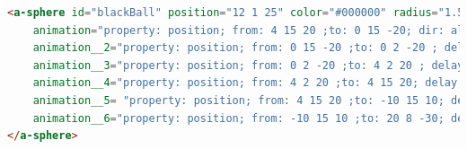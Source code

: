 \begin{lstlisting}[language=html]
<a-sphere id="blackBall" position="12 1 25" color="#000000" radius="1.5" 
    animation="property: position; from: 4 15 20 ;to: 0 15 -20; dir: alternate; dur: 10000; loop: true"
    animation__2="property: position; from: 0 15 -20 ;to: 0 2 -20 ; delay: 10000; dir: alternate; dur: 10000; loop: true" 
    animation__3="property: position; from: 0 2 -20 ;to: 4 2 20 ; delay: 20000; dir: alternate; dur: 10000; loop: true" 
    animation__4="property: position; from: 4 2 20 ;to: 4 15 20; delay: 30000; dir: alternate; dur: 10000; loop: true" 
    animation__5= "property: position; from: 4 15 20 ;to: -10 15 10; delay: 40000; dir: alternate; dur: 10000; loop: true" 
    animation__6="property: position; from: -10 15 10 ;to: 20 8 -30; delay: 50000; dir: alternate; dur: 10000; loop: true">
</a-sphere>
\end{lstlisting}


